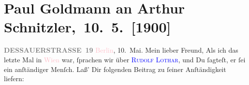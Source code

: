 

         
         \renewcommand{\erwaehntePersonen}{Personen: Moriz Benedikt, Rudolf Lothar}
         \renewcommand{\erwaehnteInstitutionen}{Institutionen: Neue Freie Presse, Volkstheater}
         \renewcommand{\erwaehnteOrte}{Orte: Berlin, Dessauer Straße, Deutsches Theater Berlin, Europa, Wien}
         \renewcommand{\erwaehnteWerke}{Werke: König Harlekin. Maskenspiel in vier Aufzügen, Neue Freie Presse}
               \section[ Paul Goldmann an Arthur Schnitzler, 10. 5. {[}1900{]}]{Paul Goldmann an Arthur Schnitzler, 10. 5. {[}1900{]}}\nopagebreak{}\rehead{ }\normalsize\beginnumbering{} \toendnotes[C]{\smallbreak\pagebreak[2]} 
\toendnotes[C]{\smallbreak}\pstart
           \noindent{}{\pb}\textcolor{pink}{\textcolor{gray}{\textbf{DESSAUERSTRASSE 19}}}{}\ledrightnote{\textcolor{pink}{Dessauer Straße}}\pend
           \pstart
           \raggedleft{}\textcolor{pink}{Berlin}{}\ledrightnote{\textcolor{pink}{Berlin}}, 10. Mai.\pend
           \pstart\center{}Mein lieber Freund,\pend\pstart
           Als ich das letzte Mal in \textcolor{pink}{Wien}{}\ledrightnote{\textcolor{pink}{Wien}} war, ſprachen wir
               über \textsc{\textcolor{blue}{Rudolf Lothar}{}\ledrightnote{\textcolor{blue}{Rudolf Lothar}}}, und Du ſagteſt, er ſei ein anſtändiger Menſch. Laß’ Dir folgenden Beitrag zu
               ſeiner Anſtändigkeit liefern:\pend
           \pstart
